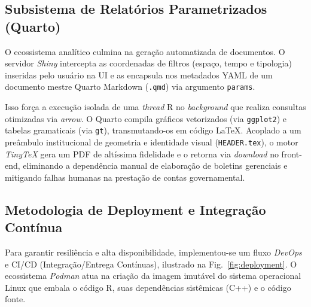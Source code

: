 \documentclass[10pt,conference]{IEEEtran}
\begin{document}
\subsection{Subsistema de Relatórios Parametrizados (Quarto)}

O ecossistema analítico culmina na geração automatizada de documentos. O servidor \textit{Shiny} intercepta as coordenadas de filtros (espaço, tempo e tipologia) inseridas pelo usuário na UI e as encapsula nos metadados YAML de um documento mestre Quarto Markdown (\texttt{.qmd}) via argumento \texttt{params}. 

Isso força a execução isolada de uma \textit{thread} R no \textit{background} que realiza consultas otimizadas via \textit{arrow}. O Quarto compila gráficos vetorizados (via \texttt{ggplot2}) e tabelas gra\-ma\-ti\-cais (via \texttt{gt}), transmutando-os em código \LaTeX{}. Acoplado a um preâmbulo institucional de geometria e identidade visual (\texttt{HEADER.tex}), o motor \textit{TinyTeX} gera um PDF de altíssima fidelidade e o retorna via \textit{download} no front-end, eliminando a dependência manual de elaboração de boletins gerenciais e mitigando falhas humanas na prestação de contas governamental.

\subsection{Metodologia de Deployment e Integração Contínua}

Para garantir resiliência e alta disponibilidade, implementou-se um fluxo \textit{DevOps} e CI/CD (Integração/Entrega Contínuas), ilustrado na Fig.~\ref{fig:deployment}. O ecossistema \textit{Podman} \cite{podman2026} atua na criação da imagem imutável do sistema operacional Linux que embala o código R, suas dependências sistêmicas (C++) e o código fonte. 
\end{document}
